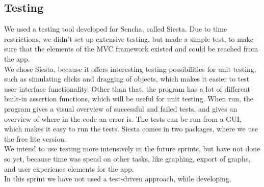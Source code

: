 \subsection{Testing} %
\label{sub:Testing}
We used a testing tool developed for Sencha, called Siesta. Due to time restrictions, we didn't set up extensive testing, but made a simple test, to make sure that the elements of the MVC framework existed and could be reached from the app. \\
We chose Siesta, because it offers interesting testing possibilities for unit testing, such as simulating clicks and dragging of objects, which makes it easier to test user interface functionality. Other than that, the program has a lot of different built-in assertion functions, which will be useful for unit testing. When run, the program gives a visual overview of successful and failed tests, and gives an overview of where in the code an error is. The tests can be run from a GUI, which makes it easy to run the tests.
Siesta comes in two packages, where we use the free lite version. \\
We intend to use testing more intensively in the future sprints, but have not done so yet, because time was spend on other tasks, like graphing, export of graphs, and user experience elements for the app. \\
In this sprint we have not used a test-driven approach, while developing.
